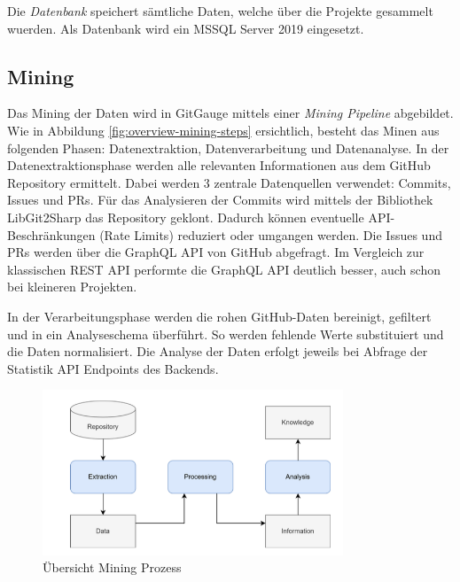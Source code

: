 Die \textit{Datenbank} speichert sämtliche Daten, welche über die Projekte gesammelt wuerden. Als Datenbank wird ein MSSQL Server 2019 eingesetzt. \parencite{grand_joel_vt1_joelgrand_repository_2024}

\subsection{Mining}
Das Mining der Daten wird in GitGauge mittels einer \textit{Mining Pipeline} abgebildet. Wie in Abbildung \autoref{fig:overview-mining-steps} ersichtlich, besteht das Minen aus folgenden Phasen: Datenextraktion, Datenverarbeitung und Datenanalyse. 
In der Datenextraktionsphase werden alle relevanten Informationen aus dem GitHub Repository ermittelt. Dabei werden 3 zentrale Datenquellen verwendet: Commits, Issues und PRs. Für das Analysieren der Commits wird mittels der Bibliothek LibGit2Sharp das Repository geklont. Dadurch können eventuelle API-Beschränkungen (Rate Limits) reduziert oder umgangen werden. Die Issues und PRs werden über die GraphQL API von GitHub abgefragt. Im Vergleich zur klassischen REST API performte die GraphQL API deutlich besser, auch schon bei kleineren Projekten.  

In der Verarbeitungsphase werden die rohen GitHub-Daten bereinigt, gefiltert und in ein Analyseschema überführt. So werden fehlende Werte substituiert und die Daten normalisiert. 
Die Analyse der Daten erfolgt jeweils bei Abfrage der Statistik API Endpoints des Backends. 

\begin{figure}[htbp]
    \centering
    \includegraphics[width=0.8\textwidth]{Figures/uebersicht-mining-prozess.png}
    \caption{Übersicht Mining Prozess \parencite{grand_joel_vt1_joelgrand_repository_2024}}
    \label{fig:overview-mining-steps}
\end{figure}
